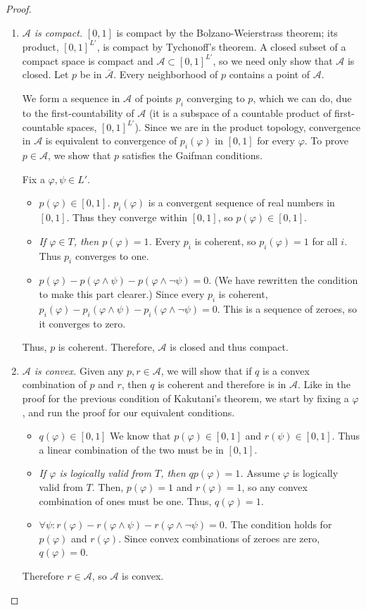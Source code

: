 \documentclass[12pt]{article}
\newcommand{\vp}{\varphi}
\theoremstyle{plain}
\theoremstyle{definition}
\theoremstyle{remark}
\begin{document}
\begin{proof}
\begin{enumerate}
\item \emph{$\mathcal{A}$ is compact.}
$[0,1]$ is compact by the Bolzano-Weierstrass theorem; its product, $[0,1]^{L'}$, is compact by Tychonoff's theorem.
A closed subset of a compact space is compact and $\mathcal{A}\subset [0,1]^{L'}$, so we need only show that $\mathcal{A}$ is closed.
Let $p$ be in $\bar{\mathcal{A}}$.
Every neighborhood of $p$ contains a point of $\mathcal{A}$.

We form a sequence in $\mathcal{A}$ of points $p_i$ converging to $p$, which we can do, due to the first-countability of $\mathcal{A}$ (it is a subspace of a countable product of first-countable spaces, $[0,1]^{L'}$).
Since we are in the product topology, convergence in $\mathcal{A}$ is equivalent to convergence of $p_i(\vp)$ in $[0,1]$ for every $\vp$.
To prove $p\in\mathcal{A}$, we show that $p$ satisfies the Gaifman conditions.

Fix a $\vp,\psi\in L'$.
\begin{itemize}
\item \emph{$p(\vp)\in [0,1]$.}
$p_i(\vp)$ is a convergent sequence of real numbers in $[0, 1]$.
Thus they converge within $[0,1]$, so $p(\vp)\in[0,1]$.
\item \emph{If $\vp\in T$, then $p(\vp)=1$.}
Every $p_i$ is coherent, so $p_i(\vp)=1$ for all $i$. Thus $p_i$ converges to one.
\item $p(\vp)-p(\vp\wedge\psi)-p(\vp\wedge\neg\psi)=0$.
(We have rewritten the condition to make this part clearer.)
Since every $p_i$ is coherent, $p_i(\vp) -p_i(\vp\wedge\psi)-p_i(\vp\wedge\neg\psi)=0.$
This is a sequence of zeroes, so it converges to zero.
\end{itemize}
Thus, $p$ is coherent. Therefore, $\mathcal{A}$ is closed and thus compact.
\item \emph{$\mathcal{A}$ is convex.}
Given any $p,r\in\mathcal{A}$, we will show that if $q$ is a convex combination of $p$ and $r$, then $q$ is coherent and therefore is in $\mathcal{A}$.
Like in the proof for the previous condition of Kakutani's theorem, we start by fixing a $\vp$, and run the proof for our equivalent conditions.
\begin{itemize}
\item \emph{$q(\vp) \in [0, 1]$}
We know that $p(\vp) \in [0,1]$ and $r(\psi) \in [0,1]$.
Thus a linear combination of the two must be in $[0,1]$.
\item \emph{If $\vp$ is logically valid from $T$, then $qp(\vp)=1$.}
Assume $\vp$ is logically valid from $T$.
Then, $p(\vp)=1$ and $r(\vp)=1$, so any convex combination of ones must be one.
Thus, $q(\vp) = 1$.
\item \emph{$\forall \psi: r(\vp) -r(\vp\wedge\psi)-r(\vp\wedge\neg\psi)=0$.}
The condition holds for $p(\vp)$ and $r(\vp)$.
Since convex combinations of zeroes are zero, $q(\vp)=0$.
\end{itemize}
Therefore $r\in\mathcal{A}$, so $\mathcal{A}$ is convex.


\end{enumerate}
\end{proof}
\end{document}
